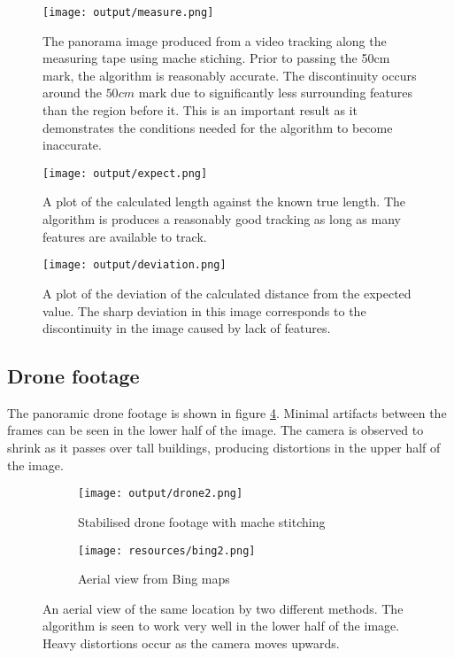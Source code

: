 \begin{figure}
  \centering
  \texttt{[image: output/measure.png]}
  \caption{The panorama image produced from a video tracking along the measuring tape using mache stiching.
  Prior to passing the 50cm mark, the algorithm is reasonably accurate.
  The discontinuity occurs around the $50cm$ mark due to significantly less surrounding features than the region before it.
  This is an important result as it demonstrates the conditions needed for the algorithm to become inaccurate.}
  \label{fig:measure}
\end{figure}

\begin{figure}
  \centering
  \texttt{[image: output/expect.png]}
  \caption{A plot of the calculated length against the known true length.
  The algorithm is produces a reasonably good tracking as long as many features are available to track.}
  \label{fig:expect}
\end{figure}

\begin{figure}
  \centering
  \texttt{[image: output/deviation.png]}
  \caption{A plot of the deviation of the calculated distance from the expected value.
  The sharp deviation in this image corresponds to the discontinuity in the image caused by lack of features.}
  \label{fig:deviation}
\end{figure}

\subsection{Drone footage}

The panoramic drone footage is shown in figure \ref{fig:drone}.
Minimal artifacts between the frames can be seen in the lower half of the image.
The camera is observed to shrink as it passes over tall buildings,
producing distortions in the upper half of the image. 

\begin{figure}
  \centering
  \begin{subfigure}[b]{0.7\textwidth}
    \texttt{[image: output/drone2.png]}
    \caption{Stabilised drone footage with mache stitching}
    \label{fig:drone}
  \end{subfigure}
  \begin{subfigure}[b]{0.7\textwidth}
    \texttt{[image: resources/bing2.png]}
    \caption{Aerial view from Bing maps}
    \label{fig:bing}
  \end{subfigure}
	\caption{An aerial view of the same location by two different methods.
  The algorithm is seen to work very well in the lower half of the image.
  Heavy distortions occur as the camera moves upwards.}
\end{figure}
